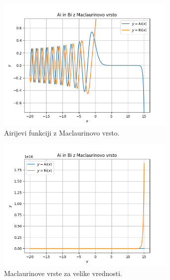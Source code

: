 \documentclass[a4paper, 12pt, slovene]{article}
\begin{document}
\begin{figure}[H]
\centering
\begin{subfigure}{0.49\textwidth}
	\centering
	\includegraphics[width=0.95\textwidth]{grafi/maclaurinova.png}
	\caption{Airijevi funkciji z Maclaurinovo vrsto.}
	\label{fig-mcl}
\end{subfigure}%
\begin{subfigure}{0.49\textwidth}
	\centering
	\includegraphics[width=0.95\textwidth]{grafi/maclaurin_velike.png}
	\caption{Maclaurinove vrste za velike vrednosti.}
	\label{fig-mclbig}
\end{subfigure}
\begin{subfigure}{0.49\textwidth}
	\centering

\end{subfigure}
\end{figure}
\end{document}
